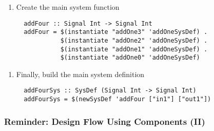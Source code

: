 \documentclass{beamer}
\begin{document}
\begin{frame}[fragile]
\begin{overprint}
   \begin{enumerate}[4)]
   \item Create the main system function
   \begin{lstlisting}
  addFour :: Signal Int -> Signal Int
  addFour = $(instantiate "addOne3" 'addOneSysDef) .
            $(instantiate "addOne2" 'addOneSysDef) .
            $(instantiate "addOne1" 'addOneSysDef) .
            $(instantiate "addOne0" 'addOneSysDef)
   \end{lstlisting}
   \end{enumerate}

   \begin{enumerate}[5)]
   \item Finally, build the main system definition
   \begin{lstlisting}
  addFourSys :: SysDef (Signal Int -> Signal Int)
  addFourSys = $(newSysDef 'addFour ["in1"] ["out1"])
   \end{lstlisting}
   \end{enumerate}

\end{overprint}

\end{frame}

\begin{frame}
  \frametitle{Reminder: Design Flow Using Components (II)}
\vspace{-0.2cm}
\begin{center}
\end{center}

\end{frame}
\end{document}
